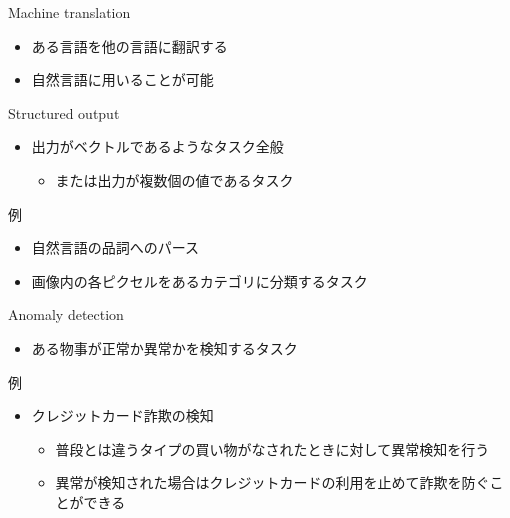 \documentclass[dvipdfmx, 10pt]{beamer}
\begin{document}

\begin{frame}{Machine translation}
  \begin{itemize}
    \item ある言語を他の言語に翻訳する
    \item 自然言語に用いることが可能
  \end{itemize}
\end{frame}


\begin{frame}{Structured output}
  \begin{itemize}
    \item 出力がベクトルであるようなタスク全般
    \begin{itemize}
      \item または出力が複数個の値であるタスク
    \end{itemize}
  \end{itemize}
  \begin{exampleblock}{例}
    \begin{itemize}
      \item 自然言語の品詞へのパース
      \item 画像内の各ピクセルをあるカテゴリに分類するタスク
    \end{itemize}
  \end{exampleblock}
\end{frame}


\begin{frame}{Anomaly detection}
  \begin{itemize}
    \item ある物事が正常か異常かを検知するタスク
  \end{itemize}
  \begin{exampleblock}{例}
    \begin{itemize}
      \item クレジットカード詐欺の検知
      \begin{itemize}
        \item 普段とは違うタイプの買い物がなされたときに対して異常検知を行う
        \item 異常が検知された場合はクレジットカードの利用を止めて詐欺を防ぐことができる
      \end{itemize}
    \end{itemize}
  \end{exampleblock}
\end{frame}
\end{document}

